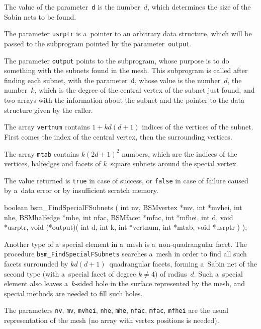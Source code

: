 The value of the parameter~\texttt{d} is the number~$d$, which determines
the size of the Sabin nets to be found.

The parameter \texttt{usrptr} is a~pointer to an arbitrary data structure,
which will be passed to the subprogram pointed by the
parameter~\texttt{output}.

The parameter \texttt{output} points to the subprogram, whose purpose is to
do something with the subnets found in the mesh. This subprogram is called
after finding each subnet, with the parameter~\texttt{d}, whose value is the
number~$d$, the number~$k$, which is the degree of the central vertex of the
subnet just found, and two arrays with the information about the subnet and
the pointer to the data structure given by the caller.

The array \texttt{vertnum} contains $1+kd(d+1)$ indices of the vertices of
the subnet. First comes the index of the central vertex, then the
surrounding vertices.

The array \texttt{mtab} contains $k(2d+1)^2$ numbers, which are the indices
of the vertices, halfedges and facets of $k$~square subnets around the
special vertex.

The value returned is \texttt{true} in case of success, or \texttt{false} in
case of failure caused by a~data error or by insufficient scratch memory.


\medskip
\begin{listingC}
boolean bsm_FindSpecialFSubnets ( int nv, BSMvertex *mv, int *mvhei,
                          int nhe, BSMhalfedge *mhe,
                          int nfac, BSMfacet *mfac, int *mfhei,
                          int d, void *usrptr,
                          void (*output)( int d, int k, int *vertnum,
                                          int *mtab, void *usrptr ) );
\end{listingC}
Another type of a~special element in a~mesh is a~non-quadrangular facet. The
procedure \texttt{bsm\_FindSpecialFSubnets} searches a~mesh in order to find
all such facets surrounded by $kd(d+1)$~quadrangular facets, forming a~Sabin
net of the second type (with a~special facet of degree $k\neq 4$)
of radius~$d$. Such a~special element also leaves a~$k$-sided hole in the
surface represented by the mesh, and special methods are needed to fill such
holes.

The parameters \texttt{nv}, \texttt{mv}, \texttt{mvhei}, \texttt{nhe},
\texttt{mhe}, \texttt{nfac}, \texttt{mfac}, \texttt{mfhei} are the usual
representation of the mesh (no array with vertex positions is needed).

